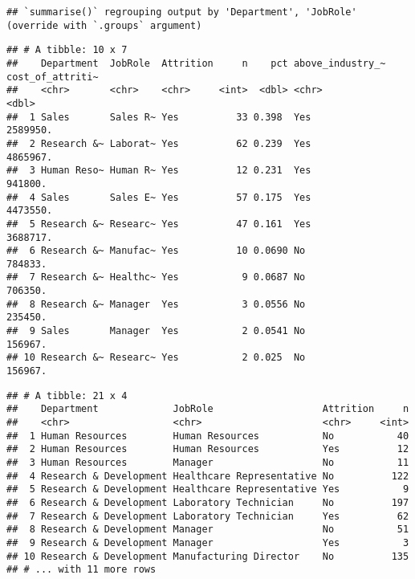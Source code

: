 \documentclass[
]{article}
\newenvironment{Shaded}{\begin{snugshade}}{\end{snugshade}}
\newcommand{\CommentTok}[1]{\textcolor[rgb]{0.56,0.35,0.01}{\textit{#1}}}
\newcommand{\KeywordTok}[1]{\textcolor[rgb]{0.13,0.29,0.53}{\textbf{#1}}}
\newcommand{\NormalTok}[1]{#1}
\newcommand{\OperatorTok}[1]{\textcolor[rgb]{0.81,0.36,0.00}{\textbf{#1}}}
\newcommand{\StringTok}[1]{\textcolor[rgb]{0.31,0.60,0.02}{#1}}
\begin{document}
\begin{verbatim}
## `summarise()` regrouping output by 'Department', 'JobRole' (override with `.groups` argument)
\end{verbatim}

\begin{verbatim}
## # A tibble: 10 x 7
##    Department  JobRole  Attrition     n    pct above_industry_~ cost_of_attriti~
##    <chr>       <chr>    <chr>     <int>  <dbl> <chr>                       <dbl>
##  1 Sales       Sales R~ Yes          33 0.398  Yes                      2589950.
##  2 Research &~ Laborat~ Yes          62 0.239  Yes                      4865967.
##  3 Human Reso~ Human R~ Yes          12 0.231  Yes                       941800.
##  4 Sales       Sales E~ Yes          57 0.175  Yes                      4473550.
##  5 Research &~ Researc~ Yes          47 0.161  Yes                      3688717.
##  6 Research &~ Manufac~ Yes          10 0.0690 No                        784833.
##  7 Research &~ Healthc~ Yes           9 0.0687 No                        706350.
##  8 Research &~ Manager  Yes           3 0.0556 No                        235450.
##  9 Sales       Manager  Yes           2 0.0541 No                        156967.
## 10 Research &~ Researc~ Yes           2 0.025  No                        156967.
\end{verbatim}

\begin{Shaded}
\end{Shaded}

\begin{verbatim}
## # A tibble: 21 x 4
##    Department             JobRole                   Attrition     n
##    <chr>                  <chr>                     <chr>     <int>
##  1 Human Resources        Human Resources           No           40
##  2 Human Resources        Human Resources           Yes          12
##  3 Human Resources        Manager                   No           11
##  4 Research & Development Healthcare Representative No          122
##  5 Research & Development Healthcare Representative Yes           9
##  6 Research & Development Laboratory Technician     No          197
##  7 Research & Development Laboratory Technician     Yes          62
##  8 Research & Development Manager                   No           51
##  9 Research & Development Manager                   Yes           3
## 10 Research & Development Manufacturing Director    No          135
## # ... with 11 more rows
\end{verbatim}
\end{document}
